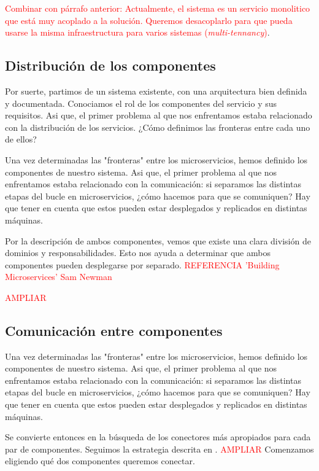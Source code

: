 
\textcolor{red}{Combinar con párrafo anterior: Actualmente, el sistema es un servicio monolitico que está muy acoplado a la solución. Queremos desacoplarlo para que pueda usarse la misma infraestructura para varios sistemas (\textit{multi-tennancy})}.

\subsection{Distribución de los componentes}

Por suerte, partimos de un sistema existente, con una arquitectura bien definida y documentada. Conociamos el rol de los componentes del servicio y sus requisitos. Asi que, el primer problema al que nos enfrentamos estaba relacionado con la distribución de los servicios. ¿Cómo definimos las fronteras entre cada uno de ellos?

Una vez determinadas las "fronteras" entre los microservicios, hemos definido los componentes de nuestro sistema. Asi que, el primer problema al que nos enfrentamos estaba relacionado con la comunicación: si separamos las distintas etapas del bucle en microservicios, ¿cómo hacemos para que se comuniquen? Hay que tener en cuenta que estos pueden estar desplegados y replicados en distintas máquinas.

Por la descripción de ambos componentes, vemos que existe una clara división de dominios y responsabilidades. Esto nos ayuda a determinar que ambos componentes pueden desplegarse por separado. \textcolor{red}{REFERENCIA 'Building Microservices' Sam Newman}

\textcolor{red}{AMPLIAR}

\subsection{Comunicación entre componentes}

Una vez determinadas las "fronteras" entre los microservicios, hemos definido los componentes de nuestro sistema. Asi que, el primer problema al que nos enfrentamos estaba relacionado con la comunicación: si separamos las distintas etapas del bucle en microservicios, ¿cómo hacemos para que se comuniquen? Hay que tener en cuenta que estos pueden estar desplegados y replicados en distintas máquinas.

Se convierte entonces en la búsqueda de los conectores más apropiados para cada par de componentes. Seguimos la estrategia descrita en \cite{taylorSoftwareArchitectureFoundations2009}. \textcolor{red}{AMPLIAR} Comenzamos eligiendo qué dos componentes queremos conectar.

